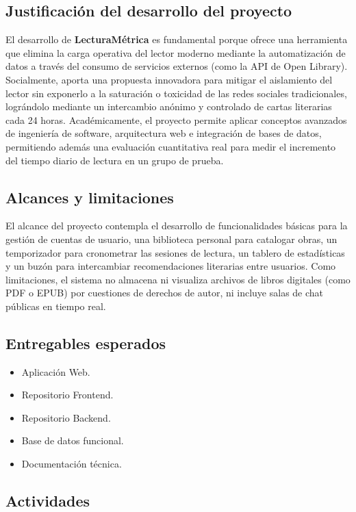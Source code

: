 \documentclass[12pt, atypical, journal]{article}
\begin{document}
\subsection{Justificación del desarrollo del proyecto}
El desarrollo de \textbf{LecturaMétrica} es fundamental porque ofrece una herramienta que elimina la carga operativa del lector moderno mediante la automatización de datos a través del consumo de servicios externos (como la API de Open Library). Socialmente, aporta una propuesta innovadora para mitigar el aislamiento del lector sin exponerlo a la saturación o toxicidad de las redes sociales tradicionales, lográndolo mediante un intercambio anónimo y controlado de cartas literarias cada 24 horas. Académicamente, el proyecto permite aplicar conceptos avanzados de ingeniería de software, arquitectura web e integración de bases de datos, permitiendo además una evaluación cuantitativa real para medir el incremento del tiempo diario de lectura en un grupo de prueba.


\subsection{Alcances y limitaciones}
El alcance del proyecto contempla el desarrollo de funcionalidades básicas para la gestión de cuentas de usuario, una biblioteca personal para catalogar obras, un temporizador para cronometrar las sesiones de lectura, un tablero de estadísticas y un buzón para intercambiar recomendaciones literarias entre usuarios. Como limitaciones, el sistema no almacena ni visualiza archivos de libros digitales (como PDF o EPUB) por cuestiones de derechos de autor, ni incluye salas de chat públicas en tiempo real.

\subsection{Entregables esperados}

\begin{itemize}
    \item Aplicación Web.
    \item Repositorio Frontend.
    \item Repositorio Backend.
    \item Base de datos funcional.
    \item Documentación técnica.
\end{itemize}

\subsection{Actividades}
\end{document}
